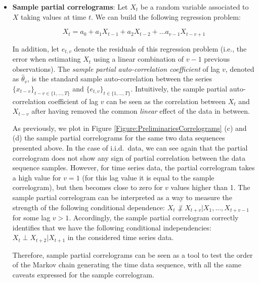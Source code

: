 \begin{itemize}
\item \textbf{Sample partial correlograms}: Let $X_t$ be a random variable associated to $X$ taking values at time $t$. We can build the following regression problem:

$$ X_t = a_0 + a_1X_{t-1} + a_2X_{t-2} + ... a_{v-1}X_{t-v+1}$$

In addition, let $e_{t,v}$ denote the residuals of this regression problem (i.e., the error when estimating $X_t$ using a linear combination of $v-1$ previous observations). The \emph{sample partial auto-correlation coefficient} of lag $v$, denoted as  $\hat{\theta}_v$, is the standard sample auto-correlation between the series $\{x_{t-v}\}_{t-v\in\{1,...,T\}}$ and $\{e_{t,v}\}_{t\in\{1,...,T\}}$. Intuitively, the sample partial auto-correlation coefficient of lag $v$ can be seen as the correlation between $X_t$ and $X_{t-v}$ after having removed the common \emph{linear} effect of the data in between.

As previously, we plot in Figure \ref{Figure:PreliminariesCorrelograms} (c) and (d) the sample partial correlograms for the same two data sequences presented above. In the case of i.i.d.\ data, we can see again that the partial correlogram does not show any sign of partial correlation between the data sequence samples. However, for time series data, the partial correlogram takes a high value for $v=1$ (for this lag value it is equal to the sample correlogram), but then becomes close to zero for $v$ values higher than 1. The sample partial correlogram can be interpreted as a way to measure the strength of the following conditional dependence: $X_t  \not\perp X_{t+v} | X_1,...,X_{t+v-1}$ for some lag $v>1$. Accordingly, the sample partial correlogram correctly identifies that we have the following conditional independencies: $X_t\perp X_{t+2}|X_{t+1}$ in the considered time series data. 

Therefore, sample partial correlograms can be seen as a tool to test the order of the Markov chain generating the time data sequence, with all the same caveats expressed for the sample correlogram. 


\end{itemize}
